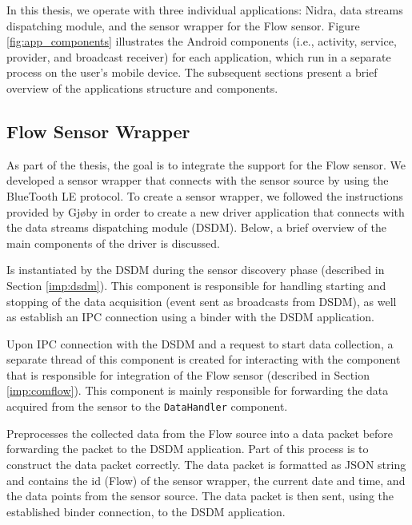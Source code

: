 In this thesis, we operate with three individual applications: Nidra, data streams dispatching module, and the sensor wrapper for the Flow sensor. Figure \ref{fig:app_components} illustrates the Android components (i.e., activity, service, provider, and broadcast receiver) for each application, which run in a separate process on the user's mobile device. The subsequent sections present a brief overview of the applications structure and components.


\subsection{Flow Sensor Wrapper}\label{imp:flowsensor}
As part of the thesis, the goal is to integrate the support for the Flow sensor. We developed a sensor wrapper that connects with the sensor source by using the BlueTooth LE protocol. To create a sensor wrapper, we followed the instructions provided by Gjøby in order to create a new driver application that connects with the data streams dispatching module (DSDM). Below, a brief overview of the main components of the driver is discussed.

\begin{description}[font=\normalfont\itshape]
    \item[WrapperService:] Is instantiated by the DSDM during the sensor discovery phase (described in Section \ref{imp:dsdm}). This component is responsible for handling starting and stopping of the data acquisition (event sent as broadcasts from DSDM), as well as establish an IPC connection using a binder with the DSDM application. 
    \item[CommunicationHandler:] Upon IPC connection with the DSDM and a request to start data collection, a separate thread of this component is created for interacting with the component that is responsible for integration of the Flow sensor (described in Section \ref{imp:comflow}). This component is mainly responsible for forwarding the data acquired from the sensor to the \verb|DataHandler| component. 
    \item[DataHandler:] Preprocesses the collected data from the Flow source into a data packet before forwarding the packet to the DSDM application. Part of this process is to construct the data packet correctly. The data packet is formatted as JSON string and contains the id (Flow) of the sensor wrapper, the current date and time, and the data points from the sensor source. The data packet is then sent, using the established binder connection, to the DSDM application.
\end{description}

